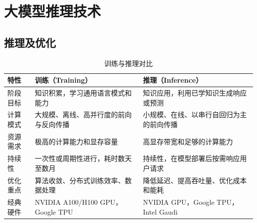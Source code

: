 \documentclass[../main.tex]{subfiles}
\begin{document}
\section{大模型推理技术}\label{sec:llm-inference}
\subsection{推理及优化}\label{sec:inference-optimization}
\begin{table}[H]
    \centering
    \caption{训练与推理对比}
    \begin{tabular}{p{2.2cm}p{5.0cm}p{5.0cm}}
        \toprule
        特性 & 训练（Training） & 推理（Inference） \\
        \midrule
        阶段目标 & 知识积累，学习通用语言模式和能力 & 知识应用，利用已学知识生成响应或预测 \\
        计算模式 & 大规模、离线、高并行度的前向与反向传播 & 小规模、在线、以串行自回归为主的前向传播 \\
        资源需求 & 极高的计算能力和显存容量 & 高显存带宽和足够的计算能力 \\
        持续性 & 一次性或周期性进行，耗时数天至数月 & 持续性，在模型部署后按需响应用户请求 \\
        优化重点 & 算法收敛、分布式训练效率、数据处理 & 降低延迟、提高吞吐量、优化成本和能耗 \\
        经典硬件 & NVIDIA A100/H100 GPU，Google TPU & NVIDIA GPU，Google TPU，Intel Gaudi \\
        \bottomrule
    \end{tabular}
\end{table}
    
\end{document}
